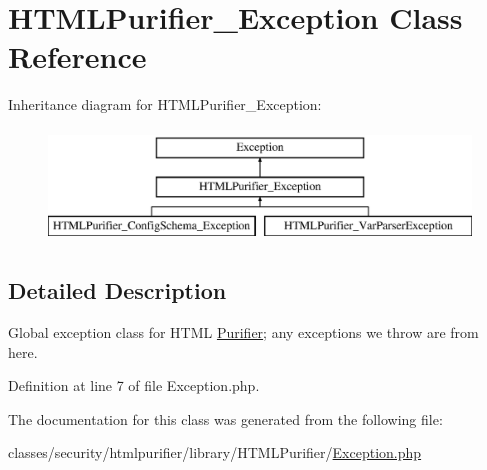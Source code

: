 \hypertarget{classHTMLPurifier__Exception}{\section{H\+T\+M\+L\+Purifier\+\_\+\+Exception Class Reference}
\label{classHTMLPurifier__Exception}
}
Inheritance diagram for H\+T\+M\+L\+Purifier\+\_\+\+Exception\+:\begin{figure}[H]
\begin{center}
\leavevmode
\includegraphics[height=3.000000cm]{classHTMLPurifier__Exception}
\end{center}
\end{figure}


\subsection{Detailed Description}
Global exception class for H\+T\+M\+L \hyperlink{classPurifier}{Purifier}; any exceptions we throw are from here. 

Definition at line 7 of file Exception.\+php.



The documentation for this class was generated from the following file\+:\begin{DoxyCompactItemize}
\item 
classes/security/htmlpurifier/library/\+H\+T\+M\+L\+Purifier/\hyperlink{Exception_8php}{Exception.\+php}\end{DoxyCompactItemize}
